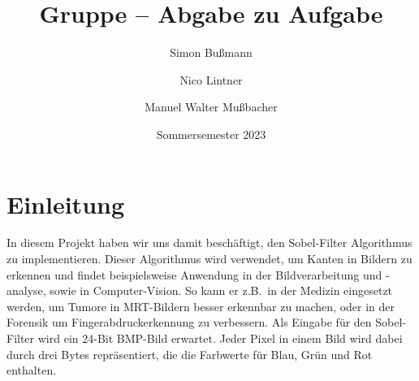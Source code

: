 \documentclass[course=erap]{aspdoc}
\author{Simon Bußmann \and Nico Lintner \and Manuel Walter Mußbacher}
\date{Sommersemester 2023}
\title{Gruppe \theGroup{} -- Abgabe zu Aufgabe \theNumber}
\begin{document}
\maketitle

\section{Einleitung}
\label{sec:einleitung}
In diesem Projekt haben wir uns damit beschäftigt, den Sobel-Filter Algorithmus zu implementieren.
Dieser Algorithmus wird verwendet, um Kanten in Bildern zu erkennen und findet beispielsweise Anwendung in der Bildverarbeitung und -analyse, sowie in Computer-Vision.
So kann er z.B.\ in der Medizin eingesetzt werden, um Tumore in MRT-Bildern besser erkennbar zu machen\cite{7002427},
oder in der Forensik um Fingerabdruckerkennung zu verbessern\cite{6900702}.
Als Eingabe für den Sobel-Filter wird ein 24-Bit BMP-Bild erwartet.
Jeder Pixel in einem Bild wird dabei durch drei Bytes repräsentiert, die die Farbwerte für Blau, Grün und Rot enthalten.
\end{document}
